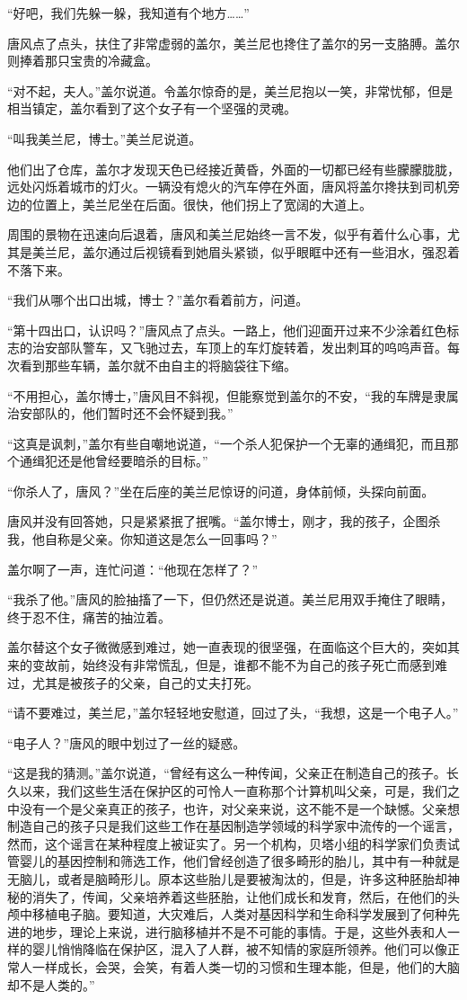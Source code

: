 “好吧，我们先躲一躲，我知道有个地方……”

唐风点了点头，扶住了非常虚弱的盖尔，美兰尼也搀住了盖尔的另一支胳膊。盖尔则捧着那只宝贵的冷藏盒。

“对不起，夫人。”盖尔说道。令盖尔惊奇的是，美兰尼抱以一笑，非常忧郁，但是相当镇定，盖尔看到了这个女子有一个坚强的灵魂。

“叫我美兰尼，博士。”美兰尼说道。

他们出了仓库，盖尔才发现天色已经接近黄昏，外面的一切都已经有些朦朦胧胧，远处闪烁着城市的灯火。一辆没有熄火的汽车停在外面，唐风将盖尔搀扶到司机旁边的位置上，美兰尼坐在后面。很快，他们拐上了宽阔的大道上。

周围的景物在迅速向后退着，唐风和美兰尼始终一言不发，似乎有着什么心事，尤其是美兰尼，盖尔通过后视镜看到她眉头紧锁，似乎眼眶中还有一些泪水，强忍着不落下来。

“我们从哪个出口出城，博士？”盖尔看着前方，问道。

“第十四出口，认识吗？”唐风点了点头。一路上，他们迎面开过来不少涂着红色标志的治安部队警车，又飞驰过去，车顶上的车灯旋转着，发出刺耳的呜呜声音。每次看到那些车辆，盖尔就不由自主的将脑袋往下缩。

“不用担心，盖尔博士，”唐风目不斜视，但能察觉到盖尔的不安，“我的车牌是隶属治安部队的，他们暂时还不会怀疑到我。”

“这真是讽刺，”盖尔有些自嘲地说道，“一个杀人犯保护一个无辜的通缉犯，而且那个通缉犯还是他曾经要暗杀的目标。”

“你杀人了，唐风？”坐在后座的美兰尼惊讶的问道，身体前倾，头探向前面。

唐风并没有回答她，只是紧紧抿了抿嘴。“盖尔博士，刚才，我的孩子，企图杀我，他自称是父亲。你知道这是怎么一回事吗？”

盖尔啊了一声，连忙问道：“他现在怎样了？”

“我杀了他。”唐风的脸抽搐了一下，但仍然还是说道。美兰尼用双手掩住了眼睛，终于忍不住，痛苦的抽泣着。

盖尔替这个女子微微感到难过，她一直表现的很坚强，在面临这个巨大的，突如其来的变故前，始终没有非常慌乱，但是，谁都不能不为自己的孩子死亡而感到难过，尤其是被孩子的父亲，自己的丈夫打死。

“请不要难过，美兰尼，”盖尔轻轻地安慰道，回过了头，“我想，这是一个电子人。”

“电子人？”唐风的眼中划过了一丝的疑惑。

“这是我的猜测。”盖尔说道，“曾经有这么一种传闻，父亲正在制造自己的孩子。长久以来，我们这些生活在保护区的可怜人一直称那个计算机叫父亲，可是，我们之中没有一个是父亲真正的孩子，也许，对父亲来说，这不能不是一个缺憾。父亲想制造自己的孩子只是我们这些工作在基因制造学领域的科学家中流传的一个谣言，然而，这个谣言在某种程度上被证实了。另一个机构，贝塔小组的科学家们负责试管婴儿的基因控制和筛选工作，他们曾经创造了很多畸形的胎儿，其中有一种就是无脑儿，或者是脑畸形儿。原本这些胎儿是要被淘汰的，但是，许多这种胚胎却神秘的消失了，传闻，父亲培养着这些胚胎，让他们成长和发育，然后，在他们的头颅中移植电子脑。要知道，大灾难后，人类对基因科学和生命科学发展到了何种先进的地步，理论上来说，进行脑移植并不是不可能的事情。于是，这些外表和人一样的婴儿悄悄降临在保护区，混入了人群，被不知情的家庭所领养。他们可以像正常人一样成长，会哭，会笑，有着人类一切的习惯和生理本能，但是，他们的大脑却不是人类的。”

